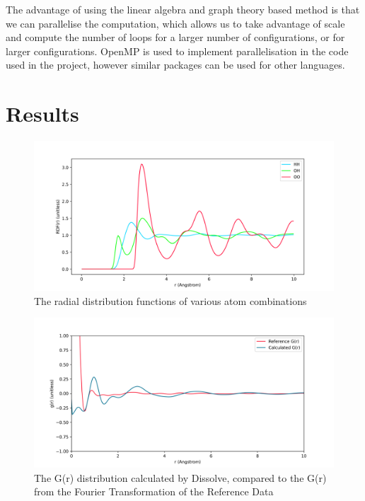 \documentclass[a4paper,11pt]{article}
\begin{document}
The advantage of using the linear algebra and graph theory based method is that we can parallelise the computation, which allows us to take advantage of scale and compute the number of loops for a larger number of configurations, or for larger configurations. OpenMP is used to implement parallelisation in the code used in the project, however similar packages can be used for other languages.
\section{Results}
\begin{figure}[H]
  \centering
  \includegraphics[width=\textwidth]{images/RDF.png}
  \caption{The radial distribution functions of various atom combinations}
  \label{fig:rdf}
\end{figure}
\begin{figure}[H]
  \centering
  \includegraphics[width=\textwidth]{images/GR.png}
  \caption{The G(r) distribution calculated by Dissolve, compared to the G(r) from the Fourier Transformation of the Reference Data}
  \label{fig:gr}
\end{figure}
\end{document}
